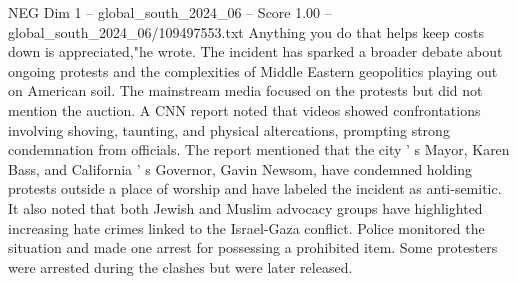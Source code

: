 \begin{textsample}{NEG Dim 1 – global\_south\_2024\_06 – Score 1.00 – global\_south\_2024\_06/109497553.txt}
Anything you do that helps keep costs down is appreciated,"he wrote.
The incident has sparked a broader debate about ongoing protests and the complexities of Middle Eastern geopolitics playing out on American soil.
The mainstream media focused on the protests but did not mention the auction.
A CNN report noted that videos showed confrontations involving shoving, taunting, and physical altercations, prompting strong condemnation from officials.
The report mentioned that the city ' s Mayor, Karen Bass, and California ' s Governor, Gavin Newsom, have condemned holding protests outside a place of worship and have labeled the incident as anti-semitic.
It also noted that both Jewish and Muslim advocacy groups have highlighted increasing hate crimes linked to the Israel-Gaza conflict.
Police monitored the situation and made one arrest for possessing a prohibited item.
Some protesters were arrested during the clashes but were later released.

\end{textsample}
